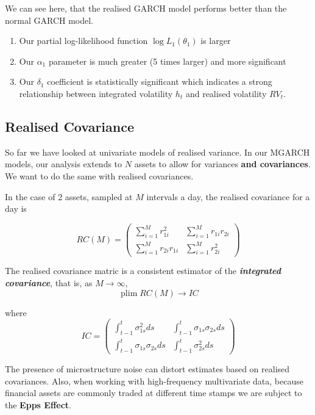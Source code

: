 \documentclass[11pt]{article}
\begin{document}
We can see here, that the realised GARCH model performs better than the normal GARCH model.
\begin{enumerate}
    \item Our partial log-likelihood function $\log L_1(\theta_1)$ is larger
    \item Our $\alpha_1$ parameter is much greater (5 times larger) and more significant
    \item Our $\delta_1$ coefficient is statistically significant which indicates a strong relationship between integrated volatility $h_t$ and realised volatility $RV_t$.
\end{enumerate}

\subsection{Realised Covariance}

So far we have looked at univariate models of realised variance. In our MGARCH models, our analysis extends to $N$ assets to allow for variances \textbf{and covariances}. We want to do the same with realised covariances.

In the case of 2 assets, sampled at $M$ intervals a day, the realised covariance for a day is

\begin{equation}
\label{realised covariance}
R C(M)=\left(\begin{array}{cc}
\sum_{i=1}^M r_{1 i}^2 & \sum_{i=1}^M r_{1 i} r_{2 i} \\
\sum_{i=1}^M r_{2 i} r_{1 i} & \sum_{i=1}^M r_{2 i}^2
\end{array}\right)
\end{equation}

The realised covariance matric is a consistent estimator of the \textbf{\textit{integrated covariance}}, that is, as $M\rightarrow\infty$, 
\[\operatorname{plim}RC(M) \rightarrow IC\]

where
\begin{equation}
\label{integrated covariance}
I C=\left(\begin{array}{cc}
\int_{t-1}^t \sigma_{1 s}^2 d s & \int_{t-1}^t \sigma_{1 s} \sigma_{2 s} d s \\
\int_{t-1}^t \sigma_{1 s} \sigma_{2 s} d s & \int_{t-1}^t \sigma_{2 s}^2 d s
\end{array}\right)
\end{equation}

\begin{note}
    The presence of microstructure noise can distort estimates based on realised covariances. Also, when working with high-frequency multivariate data, because financial assets are commonly traded at different time stamps we are subject to the \textbf{Epps Effect}.
\end{note}
\end{document}
